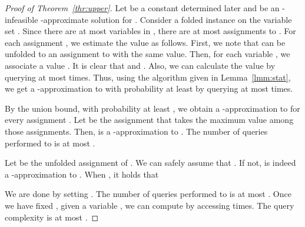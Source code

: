 \documentclass[letterpaper, 11pt]{article}
\begin{document}
\begin{proof}[Proof of Theorem~\ref{thr:upper}]
  Let  be a constant determined later and  be an -infeasible -approximate solution for .
  Consider a folded instance  on the variable set .
  Since there are at most  variables in ,
  there are at most  assignments to .
  For each assignment , 
  we estimate the value  as follows.
  First, we note that  can be unfolded to an assignment  to  with the same value.
  Then, for each variable ,
  we associate a value .
  It is clear that  and .
  Also, we can calculate the value  by querying  at most  times.
  Thus, using the algorithm given in Lemma~\ref{lmm:stat},
  we get a -approximation to  with probability at least  by querying  at most  times.

  By the union bound, 
  with probability at least ,
  we obtain a -approximation to  for every assignment .
  Let  be the assignment that takes the maximum value among those assignments.
  Then,  is a -approximation to .
  The number of queries performed to  is at most .

  Let  be the unfolded assignment of .
  We can safely assume that .
  If not,  is indeed a -approximation to .
  When , it holds that
  
  We are done by setting .
  The number of queries performed to  is at most
  .
  Once we have fixed , given a variable , we can compute  by accessing   times.
  The query complexity is at most .
\end{proof}
\end{document}
